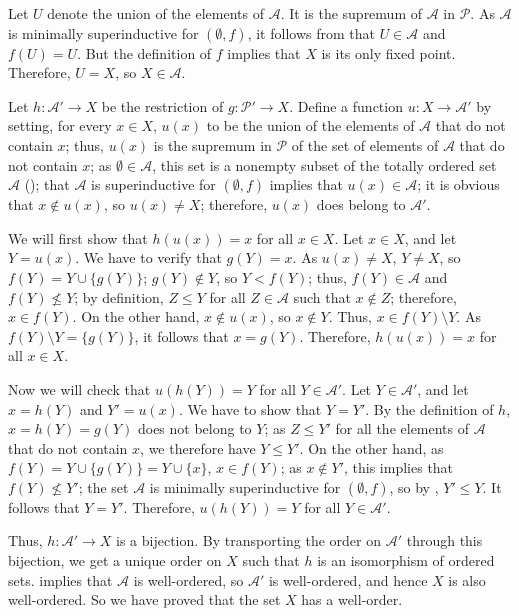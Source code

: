 \documentclass{article}
\begin{document}
\begin{solution}[\ref{exe:m0vdltb2}]
  \label{sol:7pp5s6s1}
  Let \(U\) denote the union of the elements of \(\mathcal{A}\).  It
  is the supremum of \(\mathcal{A}\) in \(\mathcal{P}\).  As
  \(\mathcal{A}\) is minimally superinductive for \((\emptyset, f)\),
  it follows from  that \(U \in \mathcal{A}\) and
  \(f(U) = U\).  But the definition of \(f\) implies that \(X\) is its
  only fixed point.  Therefore, \(U = X\), so \(X \in \mathcal{A}\).

  Let \(h : \mathcal{A}' \to X\) be the restriction of
  \(g : \mathcal{P}' \to X\).  Define a function
  \(u : X \to \mathcal{A}'\) by setting, for every \(x \in X\),
  \(u(x)\) to be the union of the elements of \(\mathcal{A}\) that do
  not contain \(x\); thus, \(u(x)\) is the supremum in \(\mathcal{P}\)
  of the set of elements of \(\mathcal{A}\) that do not contain \(x\);
  as \(\emptyset \in \mathcal{A}\), this set is a nonempty subset of
  the totally ordered set \(\mathcal{A}\) (); that
  \(\mathcal{A}\) is superinductive for \((\emptyset, f)\) implies
  that \(u(x) \in \mathcal{A}\); it is obvious that \(x \notin u(x)\),
  so \(u(x) \neq X\); therefore, \(u(x)\) does belong to
  \(\mathcal{A}'\).

  We will first show that \(h(u(x)) = x\) for all \(x \in X\).  Let
  \(x \in X\), and let \(Y = u(x)\).  We have to verify that
  \(g(Y) = x\).  As \(u(x) \neq X\), \(Y \neq X\), so
  \(f(Y) = Y \cup \{ g(Y) \}\); \(g(Y) \notin Y\), so \(Y < f(Y)\);
  thus, \(f(Y) \in \mathcal{A}\) and \(f(Y) \nleq Y\); by definition,
  \(Z \leq Y\) for all \(Z \in \mathcal{A}\) such that \(x \notin Z\);
  therefore, \(x \in f(Y)\).  On the other hand, \(x \notin u(x)\), so
  \(x \notin Y\).  Thus, \(x \in f(Y) \setminus Y\).  As
  \(f(Y) \setminus Y = \{ g(Y) \}\), it follows that \(x = g(Y)\).
  Therefore, \(h(u(x)) = x\) for all \(x \in X\).

  Now we will check that \(u(h(Y)) = Y\) for all
  \(Y \in \mathcal{A}'\).  Let \(Y \in \mathcal{A}'\), and let
  \(x = h(Y)\) and \(Y' = u(x)\).  We have to show that \(Y = Y'\).
  By the definition of \(h\), \(x = h(Y) = g(Y)\) does not belong to
  \(Y\); as \(Z \leq Y'\) for all the elements of \(\mathcal{A}\) that
  do not contain \(x\), we therefore have \(Y \leq Y'\).  On the other
  hand, as \(f(Y) = Y \cup \{ g(Y) \} = Y \cup \{ x \}\),
  \(x \in f(Y)\); as \(x \notin Y'\), this implies that
  \(f(Y) \nleq Y'\); the set \(\mathcal{A}\) is minimally
  superinductive for \((\emptyset, f)\), so by ,
  \(Y' \leq Y\).  It follows that \(Y = Y'\).  Therefore,
  \(u(h(Y)) = Y\) for all \(Y \in \mathcal{A}'\).

  Thus, \(h : \mathcal{A}' \to X\) is a bijection.  By transporting
  the order on \(\mathcal{A}'\) through this bijection, we get a
  unique order on \(X\) such that \(h\) is an isomorphism of ordered
  sets.   implies that \(\mathcal{A}\) is
  well-ordered, so \(\mathcal{A}'\) is well-ordered, and hence \(X\)
  is also well-ordered.  So we have proved that the set \(X\) has a
  well-order.
\end{solution}

\bibsection
\end{document}
